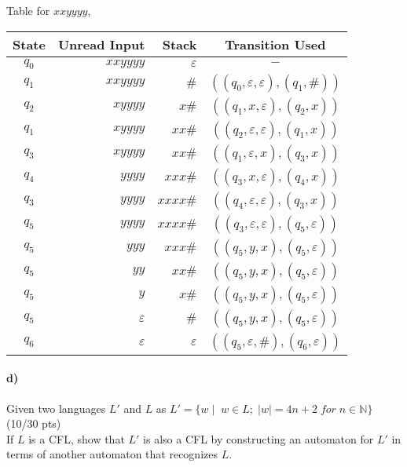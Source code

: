 \documentclass[a4paper,12pt]{article}
\begin{document}
\begin{tcolorbox}
Table for $xxyyyy$,
\begin{center}
\begin{tabular}{c | r | r | c}
	State & Unread Input & Stack & Transition Used \\ \hline
	$q_0$ & $xxyyyy$ & $\varepsilon$ & $-$ \\
	$q_1$ & $xxyyyy$ & $\#$ & $((q_0, \varepsilon, \varepsilon), (q_1, \#))$ \\
	$q_2$ & $xyyyy$ & $x\#$ & $((q_1, x, \varepsilon), (q_2, x))$ \\
	$q_1$ & $xyyyy$ & $xx\#$ & $((q_2, \varepsilon, \varepsilon), (q_1, x))$ \\
	$q_3$ & $xyyyy$ & $xx\#$ & $((q_1, \varepsilon, x), (q_3, x))$ \\
	$q_4$ & $yyyy$ & $xxx\#$ & $((q_3, x, \varepsilon), (q_4, x))$ \\
	$q_3$ & $yyyy$ & $xxxx\#$ & $((q_4, \varepsilon, \varepsilon), (q_3, x))$ \\
	$q_5$ & $yyyy$ & $xxxx\#$ & $((q_3, \varepsilon, \varepsilon), (q_5, \varepsilon))$ \\
	$q_5$ & $yyy$ & $xxx\#$ & $((q_5, y, x), (q_5, \varepsilon))$ \\
	$q_5$ & $yy$ & $xx\#$ & $((q_5, y, x), (q_5, \varepsilon))$ \\
	$q_5$ & $y$ & $x\#$ & $((q_5, y, x), (q_5, \varepsilon))$ \\
	$q_5$ & $\varepsilon$ & $\#$ & $((q_5, y, x), (q_5, \varepsilon))$ \\
	$q_6$ & $\varepsilon$ & $\varepsilon$ & $((q_5, \varepsilon, \#), (q_6, \varepsilon))$ \\
\end{tabular}
\end{center}
\end{tcolorbox}

\newpage

\paragraph{d)} Given two languages $L'$ and $L$ as $L'=\{w \mid \; w\in L; \; |w|=4n+2 \; for\; n\in \mathbb{N} \}$
\hfill \small{(10/30 pts)} \\
If $L$ is a CFL, show that $L'$ is also a CFL by constructing an automaton for $L'$ in terms of another automaton that recognizes $L$. \\
\end{document}
